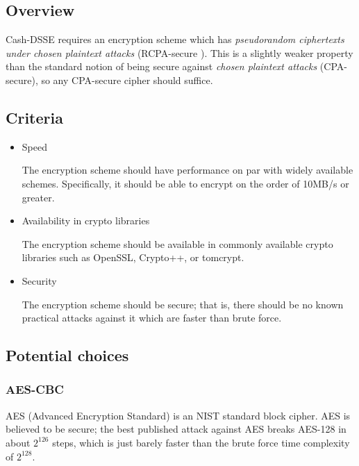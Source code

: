 \documentclass[onecolumn, draftclsnofoot,10pt, compsoc]{IEEEtran}
\begin{document}
\subsection{ Overview }

Cash-DSSE requires an encryption scheme which has \textit{pseudorandom ciphertexts under chosen plaintext attacks} (RCPA-secure ).
This is a slightly weaker property than the standard notion of being secure against \textit{chosen plaintext attacks} (CPA-secure),
so any CPA-secure cipher should suffice.

\subsection{ Criteria }

\begin{itemize}
  \item Speed

  The encryption scheme should have performance on par with widely available schemes. Specifically, it should be able to encrypt on the order of 10MB/s or greater.

  \item Availability in crypto libraries

  The encryption scheme should be available in commonly available crypto libraries such as OpenSSL, Crypto++, or tomcrypt.

  \item Security

  The encryption scheme should be secure; that is, there should be no known practical attacks against it which are faster than brute force.

\end{itemize}

\subsection{ Potential choices }
\subsubsection{ AES-CBC }

AES (Advanced Encryption Standard) is an NIST standard block cipher. AES is believed to be secure; the best published attack against AES breaks AES-128 in about $2^{126}$ steps, which is just barely faster than the brute force time complexity of $2^{128}$. 
\end{document}
